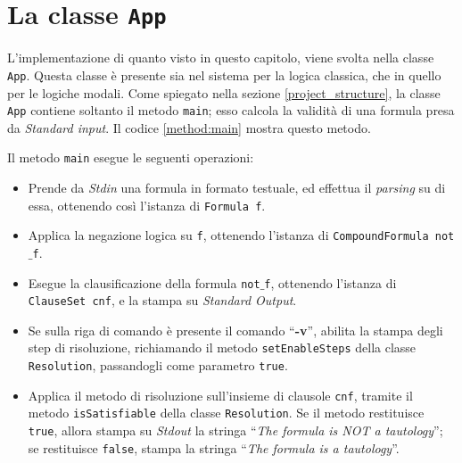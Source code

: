 \documentclass[a4paper,12pt]{report}
\begin{document}
\section{La classe \texttt{App}}
\label{class:App}
L'implementazione di quanto visto in questo capitolo, viene svolta nella classe \texttt{App}. Questa classe è presente sia nel sistema per la logica classica, che in quello per le logiche modali. Come spiegato nella sezione \ref{project_structure}, la classe \texttt{App} contiene soltanto il metodo \texttt{main}; esso calcola la validità di una formula presa da \emph{Standard input}. Il codice \ref{method:main} mostra questo metodo.

Il metodo \texttt{main} esegue le seguenti operazioni:

\begin{itemize}
    \item Prende da \emph{Stdin} una formula in formato testuale, ed effettua il \emph{parsing} su di essa, ottenendo così l'istanza di \texttt{Formula f}.
    \item Applica la negazione logica su \texttt{f}, ottenendo l'istanza di \texttt{CompoundFormula not$\_$f}.
    \item Esegue la clausificazione della formula \texttt{not$\_$f}, ottenendo l'istanza di \texttt{ClauseSet cnf}, e la stampa su \emph{Standard Output}.
    \item Se sulla riga di comando è presente il comando ``\textbf{-v}'', abilita la stampa degli step di risoluzione, richiamando il metodo \texttt{setEnableSteps} della classe \texttt{Resolution}, passandogli come parametro \texttt{true}.
    \item Applica il metodo di risoluzione sull'insieme di clausole \texttt{cnf}, tramite il metodo \texttt{isSatisfiable} della classe \texttt{Resolution}. Se il metodo restituisce \texttt{true}, allora stampa su \emph{Stdout} la stringa ``\emph{The formula is NOT a tautology}''; se restituisce \texttt{false}, stampa la stringa ``\emph{The formula is a tautology}''.
\end{itemize}
\end{document}
